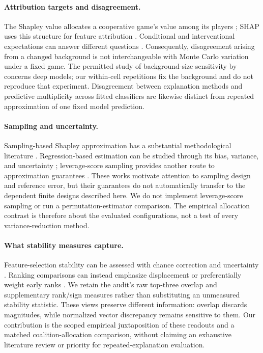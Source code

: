 \documentclass{article}
\begin{document}
\paragraph{Attribution targets and disagreement.}
The Shapley value allocates a cooperative game's value among its players \citep{Shapley1953}; SHAP uses this structure for feature attribution \citep{Lundberg2017}. Conditional and interventional expectations can answer different questions \citep{Chen2020}. Consequently, disagreement arising from a changed background is not interchangeable with Monte Carlo variation under a fixed game. The permitted study of background-size sensitivity by \citet{Yuan2022} concerns deep models; our within-cell repetitions fix the background and do not reproduce that experiment. Disagreement between explanation methods \citep{Krishna2022} and predictive multiplicity across fitted classifiers \citep{Marx2020} are likewise distinct from repeated approximation of one fixed model prediction.

\paragraph{Sampling and uncertainty.}
Sampling-based Shapley approximation has a substantial methodological literature \citep{Castro2009,Maleki2013,Mitchell2022}. Regression-based estimation can be studied through its bias, variance, and uncertainty \citep{Covert2021}; leverage-score sampling provides another route to approximation guarantees \citep{Musco2024}. These works motivate attention to sampling design and reference error, but their guarantees do not automatically transfer to the dependent finite designs described here. We do not implement leverage-score sampling or run a permutation-estimator comparison. The empirical allocation contrast is therefore about the evaluated configurations, not a test of every variance-reduction method.

\paragraph{What stability measures capture.}
Feature-selection stability can be assessed with chance correction and uncertainty \citep{Nogueira2018}. Ranking comparisons can instead emphasize displacement \citep{Diaconis1977} or preferentially weight early ranks \citep{Webber2010}. We retain the audit's raw top-three overlap and supplementary rank/sign measures rather than substituting an unmeasured stability statistic. These views preserve different information: overlap discards magnitudes, while normalized vector discrepancy remains sensitive to them. Our contribution is the scoped empirical juxtaposition of these readouts and a matched coalition-allocation comparison, without claiming an exhaustive literature review or priority for repeated-explanation evaluation.
\end{document}
